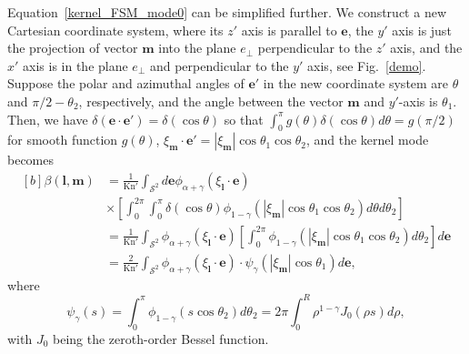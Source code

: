 Equation~\eqref{kernel_FSM_mode0} can be simplified further. We construct a new Cartesian coordinate system, where its ${z}'$ axis is parallel to $\bm{e}$, the $y'$ axis is just the projection of vector $\bm{m}$ into the plane $e_\bot$ perpendicular to the $z'$ axis, and the $x'$ axis is in the plane $e_\bot$ and perpendicular to the $y'$ axis, see Fig.~\ref{demo}. Suppose the polar and azimuthal angles of $\bm{e}'$ in the new coordinate system are $\theta$ and $\pi/2-\theta_2$, respectively, and the angle between the vector $\bm{m}$ and $y'$-axis is $\theta_1$. Then, we have $\delta(\bm{e}\cdot{\bm{e}'})=\delta(\cos\theta)$ so that $\int_0^\pi g(\theta)\delta(\cos\theta)d\theta=g(\pi/2)$ for smooth function $g(\theta)$, $\xi_{\bm{m}}\cdot{}\bm{e}'=|\xi_{\bm{m}}|\cos\theta_1\cos\theta_2$, and the kernel mode becomes
\begin{equation}\label{kernel_mode2}
\begin{aligned}[b]
\beta(\textbf{l},\textbf{m})&=\frac{1}{\text{Kn}'}\int_{\mathcal{S}^2}d\textbf{e} \phi_{\alpha+\gamma}(\xi_\textbf{l}\cdot{\textbf{e}}) \\
&\times
\left[\int_0^{2\pi}\int_0^\pi\delta(\cos\theta)\phi_{1-\gamma}(|\xi_\textbf{m}|
\cos\theta_{1}\cos\theta_2)d\theta{d\theta_2}\right]\\
&=\frac{1}{\text{Kn}'}\int_{\mathcal{S}^2}\phi_{\alpha+\gamma}(\xi_\textbf{l}\cdot{\textbf{e}})
\left[\int_0^{2\pi} \phi_{1-\gamma}(|\xi_\textbf{m}|\cos\theta_1\cos\theta_2)d\theta_2\right]d\textbf{e}\\
&=\frac{2}{\text{Kn}'}\int_{\mathcal{S}^2}\phi_{\alpha+\gamma}(\xi_\textbf{l}\cdot{\textbf{e}})
\cdot\psi_{\gamma}(|\xi_\textbf{m}|\cos\theta_1)d\textbf{e},
\end{aligned}
\end{equation}
where
\begin{equation}\label{psi_FSM_expression}
 \psi_{\gamma}(s)=\int_0^\pi\phi_{1-\gamma}(s\cos\theta_2)d\theta_2=2\pi\int_0^R \rho^{1-\gamma} J_0(\rho s)d\rho, %
\end{equation}
with $J_0$ being the zeroth-order Bessel function.



